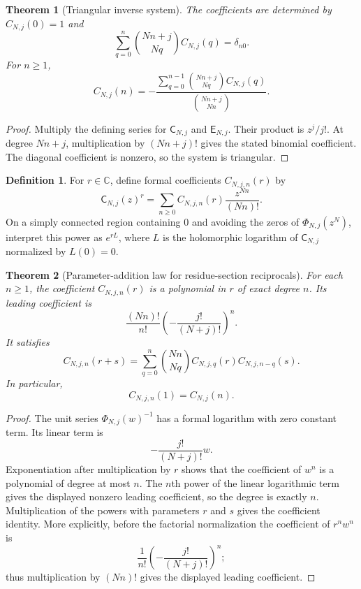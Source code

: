 \documentclass[11pt,letterpaper]{article}
\newtheorem{theorem}{Theorem}[section]
\theoremstyle{definition}
\newtheorem{definition}[definition]{Definition}
\theoremstyle{remark}
\newcommand{\CC}{\mathbb C}
\newcommand{\Efun}{\mathsf E}
\newcommand{\Cfun}{\mathsf C}
\begin{document}
\begin{theorem}[Triangular inverse system]\label{thm:triangular_inverse}
The coefficients are determined by $C_{N,j}(0)=1$ and
\[
\sum_{q=0}^{n}
\binom{Nn+j}{Nq}
C_{N,j}(q)
=
\delta_{n0}.
\]
For $n\geq1$,
\[
C_{N,j}(n)
=
-
\frac{
\displaystyle\sum_{q=0}^{n-1}
\binom{Nn+j}{Nq}C_{N,j}(q)
}{
\displaystyle\binom{Nn+j}{Nn}
}.
\]
\end{theorem}

\begin{proof}
Multiply the defining series for $\Cfun_{N,j}$ and $\Efun_{N,j}$.  Their product is $z^j/j!$.  At degree $Nn+j$, multiplication by $(Nn+j)!$ gives the stated binomial coefficient.  The diagonal coefficient is nonzero, so the system is triangular.
\end{proof}

\begin{definition}\label{def:residue_section_power}
For $r\in\CC$, define formal coefficients $C_{N,j,n}(r)$ by
\[
\Cfun_{N,j}(z)^r
=
\sum_{n\geq0}C_{N,j,n}(r)\frac{z^{Nn}}{(Nn)!}.
\]
On a simply connected region containing $0$ and avoiding the zeros of $\Phi_{N,j}(z^N)$, interpret this power as $e^{rL}$, where $L$ is the holomorphic logarithm of $\Cfun_{N,j}$ normalized by $L(0)=0$.
\end{definition}

\begin{theorem}[Parameter-addition law for residue-section reciprocals]\label{thm:residue_section_parameter_addition}
For each $n\geq1$, the coefficient $C_{N,j,n}(r)$ is a polynomial in $r$ of exact degree $n$.  Its leading coefficient is
\[
\frac{(Nn)!}{n!}
\left(-\frac{j!}{(N+j)!}\right)^n.
\]
It satisfies
\[
C_{N,j,n}(r+s)
=
\sum_{q=0}^{n}
\binom{Nn}{Nq}
C_{N,j,q}(r)C_{N,j,n-q}(s).
\]
In particular,
\[
C_{N,j,n}(1)=C_{N,j}(n).
\]
\end{theorem}

\begin{proof}
The unit series $\Phi_{N,j}(w)^{-1}$ has a formal logarithm with zero constant term.  Its linear term is
\[
-\frac{j!}{(N+j)!}w.
\]
Exponentiation after multiplication by $r$ shows that the coefficient of $w^n$ is a polynomial of degree at most $n$.  The $n$th power of the linear logarithmic term gives the displayed nonzero leading coefficient, so the degree is exactly $n$.  Multiplication of the powers with parameters $r$ and $s$ gives the coefficient identity.
More explicitly, before the factorial normalization the coefficient of
$r^nw^n$ is
\[
\frac1{n!}\left(-\frac{j!}{(N+j)!}\right)^n;
\]
thus multiplication by $(Nn)!$ gives the displayed leading coefficient.
\end{proof}
\end{document}
